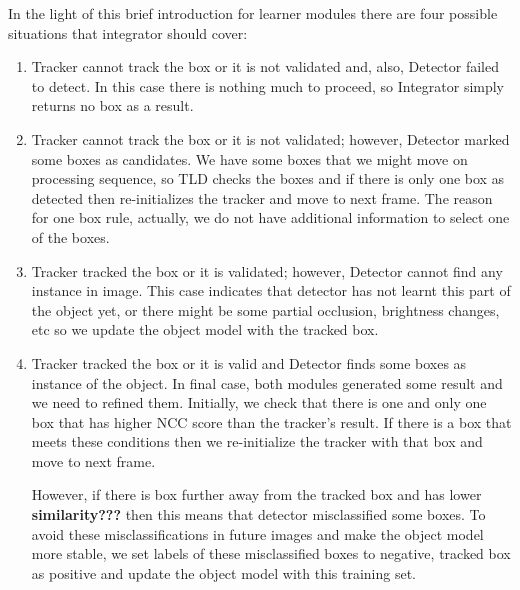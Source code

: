 \documentclass{report}
\begin{document}
            In the light of this brief introduction for learner modules there are four possible situations that integrator should cover:
            \begin{enumerate}
                \item Tracker cannot track the box or it is not validated and, also, Detector failed to detect.
                    In this case there is nothing much to proceed, so Integrator simply returns no box as a result.
                \item Tracker cannot track the box or it is not validated; however, Detector marked some boxes as candidates.
                    We have some boxes that we might move on processing sequence, so TLD checks the boxes and if there is only one
                    box as detected then re-initializes the tracker and move to next frame. The reason for one box rule, actually,
                    we do not have additional information to select one of the boxes.
                \item Tracker tracked the box or it is validated; however, Detector cannot find any instance in image.
                    This case indicates that detector has not learnt this part of the object yet, or there might be some
                    partial occlusion, brightness changes, etc so we update the object model with the tracked box.
                \item Tracker tracked the box or it is valid and Detector finds some boxes as instance of the object.
                    In final case, both modules generated some result and we need to refined them. Initially, we check that there is one
                    and only one box that has higher NCC score than the tracker's result. If there is a box that meets these conditions
                    then we re-initialize the tracker with that box and move to next frame.

                    However, if there is box further away from the tracked box and has lower \textbf{similarity???} then this means that
                    detector misclassified some boxes. To avoid these misclassifications in future images and
                    make the object model more stable, we set labels of these misclassified boxes to negative,
                    tracked box as positive and update the object model with this training set.
            \end{enumerate}
\end{document}
